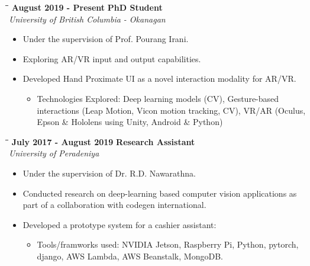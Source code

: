 \documentclass[a4paper,10pt]{article}
\begin{document}
{\begin{minipage}[t]{0.60\textwidth}
\begin{itemize}
    \end{itemize}
    \begin{tabbing}
      \=\hspace*{6cm}\=\hspace*{5cm}\= \kill
      \>\textbf{ August 2019 - Present} \> \textbf{PhD Student}\\\>\> \emph{University of British Columbia - Okanagan}
    \end{tabbing}
    \vspace{-0.4cm}
    \begin{itemize}
      \setlength\itemsep{-0.1pt}
      \small
    \item Under the supervision of Prof. Pourang Irani.
    \item Exploring AR/VR input and output capabilities.
    \item Developed Hand Proximate UI as a novel interaction modality for AR/VR.
      \vspace{-5pt}
      \begin{itemize}
      \item Technologies Explored: Deep learning models (CV), Gesture-based interactions (Leap Motion, Vicon motion tracking, CV), VR/AR (Oculus, Epson \& Hololens using Unity, Android \& Python)
      \end{itemize}
    \end{itemize}
    \begin{tabbing}
      \=\hspace*{6cm}\=\hspace*{5cm}\= \kill
      \>\textbf{ July 2017 - August 2019} \> \textbf{Research Assistant}\\\>\> \emph{University of Peradeniya}
    \end{tabbing}
    \vspace{-0.5cm}
    \begin{itemize}
      \setlength\itemsep{-0.1pt}
      \small
    \item Under the supervision of Dr. R.D. Nawarathna.
    \item Conducted research on deep-learning based computer vision applications as part of a collaboration with codegen international.
    \item Developed a prototype system for a cashier assistant:
      \vspace{-5pt}
      \begin{itemize}
        \setlength\itemsep{-0.1pt}
      \item Tools/framworks used: NVIDIA Jetson, Raspberry Pi, Python, pytorch, django, AWS Lambda, AWS Beanstalk, MongoDB.

\end{itemize}
\end{itemize}
\end{minipage}}
\end{document}
